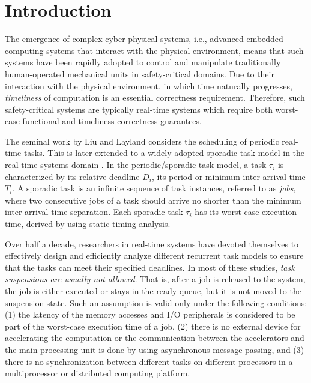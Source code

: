 \section{Introduction}

The emergence of complex cyber-physical systems, i.e., advanced embedded computing systems that interact with the physical environment, 
means that such systems have been rapidly adopted to control and manipulate traditionally human-operated mechanical units in safety-critical domains.  Due to their interaction with the physical environment, in which time naturally progresses, \emph{timeliness} of computation is an essential correctness requirement.  Therefore, such safety-critical systems are typically real-time systems which require both worst-case functional and timeliness correctness guarantees.

The seminal work by Liu and Layland \cite{Liu_1973} considers the scheduling of periodic real-time tasks. This is later extended to a widely-adopted sporadic task model in the real-time systems domain \cite{Mok:1983:FDP:888951}. In the periodic/sporadic task model, a task $\tau_i$ is characterized by its relative deadline $D_i$, its period or minimum inter-arrival time $T_i$. A sporadic task is an infinite sequence of task instances, referred to as \emph{jobs}, where two consecutive jobs of a task should arrive no shorter than the minimum inter-arrival time separation. Each sporadic task $\tau_i$ has its worst-case execution time, derived by using static timing analysis.


Over half a decade, researchers in real-time systems have devoted themselves to effectively design and efficiently analyze different recurrent task models to ensure that the tasks can meet their specified deadlines. In most of these studies, \emph{task suspensions are usually not allowed}. That is, after a job is released to the system, the job is either executed or stays in the ready queue, but it is not moved to the suspension state. 
 Such an assumption is valid only under the following conditions: (1) the latency of the memory accesses and I/O peripherals is considered to be part of the worst-case execution time of a job, (2) there is no external device for accelerating the computation or the communication between the accelerators and the main processing unit is done by using asynchronous message passing, and (3) there is no synchronization between different tasks on different processors in a multiprocessor or distributed computing platform.

